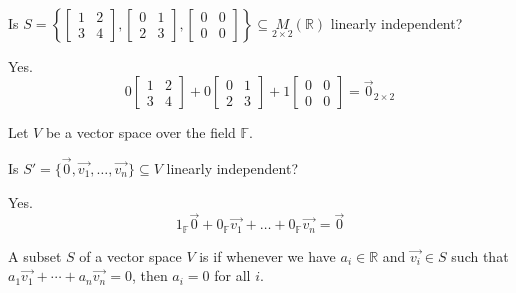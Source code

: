 \documentclass[11pt,fleqn]{book} %
\begin{document}
\begin{example}
{~~~}

    Is $S = \left\{ \begin{bmatrix} 1&2\\3&4 \end{bmatrix}, \begin{bmatrix} 0&1\\2&3 \end{bmatrix}, \begin{bmatrix} 0&0\\0&0 \end{bmatrix} \right\} \subseteq \underset{2\times2}{M}(\mathbb{R})$ linearly independent? 
    
    {\color{lightblue} Yes. $$0 \begin{bmatrix} 1&2\\3&4 \end{bmatrix} + 0 \begin{bmatrix} 0&1\\2&3 \end{bmatrix} + 1 \begin{bmatrix} 0&0\\0&0 \end{bmatrix} = \overrightarrow{0}_{2\times2}$$ }
\end{example}

\begin{example}
    Let $V$ be a vector space over the field $\mathbb{F}$. 
    
    Is $S' = \{\overrightarrow{0}, \overrightarrow{v_1}, \dots, \overrightarrow{v_n}\} \subseteq V$ linearly independent? 
    
    {\color{lightblue} Yes. $$1_{\mathbb{F}}\overrightarrow{0} + 0_{\mathbb{F}}\overrightarrow{v_1} + \dots + 0_{\mathbb{F}}\overrightarrow{v_n} = \overrightarrow{0}$$ }
\end{example}

\setcounter{section}{4}
\setcounter{definitionT}{3}
\begin{definition}
    A subset $S$ of a vector space $V$ is  if whenever we have $a_i \in \mathbb{R}$ and $\overrightarrow{v_i} \in S$ such that $a_1\overrightarrow{v_1} + \cdots + a_n\overrightarrow{v_n} = 0$, then $a_i = 0$ for all $i$.
\end{definition}
\setcounter{section}{5}
\end{document}
